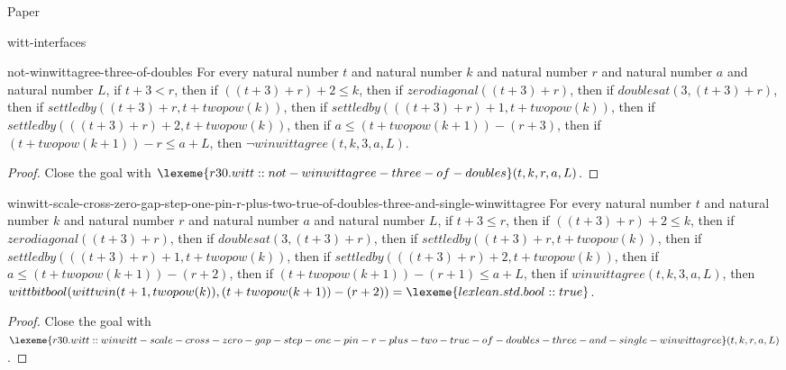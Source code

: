 \begin{lexlean}{Paper}
\begin{section}{witt-interfaces}
  \begin{theorem}{not-winwittagree-three-of-doubles}
  For every natural number \(t\) and natural number \(k\) and natural number \(r\) and natural number \(a\) and natural number \(L\), if \(t + 3 < r\), then if \(((t + 3) + r) + 2 ≤ k\), then if \(zerodiagonal((t + 3) + r)\), then if \(doublesat(3, (t + 3) + r)\), then if \(settledby((t + 3) + r, t + twopow(k))\), then if \(settledby(((t + 3) + r) + 1, t + twopow(k))\), then if \(settledby(((t + 3) + r) + 2, t + twopow(k))\), then if \(a ≤ (t + twopow(k + 1)) - (r + 3)\), then if \((t + twopow(k + 1)) - r ≤ a + L\), then \(¬ winwittagree(t, k, 3, a, L)\).
  \begin{proof}
  Close the goal with \(\lexeme{r30.witt::not-winwittagree-three-of-doubles}(t, k, r, a, L)\).
  \end{proof}
  \end{theorem}

  \begin{theorem}{winwitt-scale-cross-zero-gap-step-one-pin-r-plus-two-true-of-doubles-three-and-single-winwittagree}
  For every natural number \(t\) and natural number \(k\) and natural number \(r\) and natural number \(a\) and natural number \(L\), if \(t + 3 ≤ r\), then if \(((t + 3) + r) + 2 ≤ k\), then if \(zerodiagonal((t + 3) + r)\), then if \(doublesat(3, (t + 3) + r)\), then if \(settledby((t + 3) + r, t + twopow(k))\), then if \(settledby(((t + 3) + r) + 1, t + twopow(k))\), then if \(settledby(((t + 3) + r) + 2, t + twopow(k))\), then if \(a ≤ (t + twopow(k + 1)) - (r + 2)\), then if \((t + twopow(k + 1)) - (r + 1) ≤ a + L\), then if \(winwittagree(t, k, 3, a, L)\), then \(wittbitbool(wittwin(t + 1, twopow(k)), (t + twopow(k + 1)) - (r + 2)) = \lexeme{lexlean.std.bool::true}\).
  \begin{proof}
  Close the goal with \(\lexeme{r30.witt::winwitt-scale-cross-zero-gap-step-one-pin-r-plus-two-true-of-doubles-three-and-single-winwittagree}(t, k, r, a, L)\).
  \end{proof}
  \end{theorem}


\end{section}
\end{lexlean}
